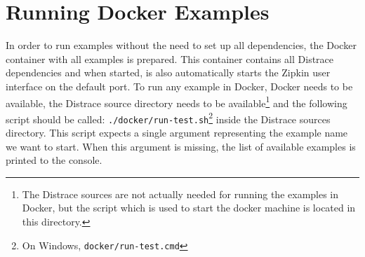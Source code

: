 \section*{Running Docker Examples}
 In order to run examples without the need to set up all dependencies, the Docker container with all examples is prepared. This container contains all Distrace dependencies and when started, is also automatically starts the Zipkin user interface on the default port. To run any example in Docker, Docker needs to be available, the Distrace source directory needs to be available\footnote{The Distrace sources are not actually needed for running the examples in Docker, but the script which is used to start the docker machine is located in this directory.} and the following script should be called: \texttt{./docker/run-test.sh}\footnote{On Windows, \texttt{docker/run-test.cmd}} inside the Distrace sources directory. This script expects a single argument representing the example name we want to start. When this argument is missing, the list of available examples is printed to the console.